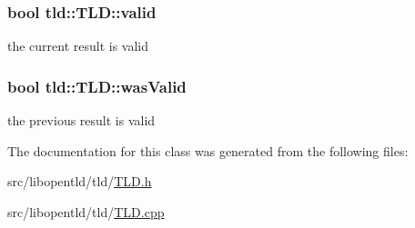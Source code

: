 \hypertarget{classtld_1_1TLD_a2a238338a62dac450b2759f99d5ae304}{
\subsubsection[{valid}]{\setlength{\rightskip}{0pt plus 5cm}bool tld\-::\-T\-L\-D\-::valid}}\label{classtld_1_1TLD_a2a238338a62dac450b2759f99d5ae304}


the current result is valid 

\hypertarget{classtld_1_1TLD_a26e0c624178eb37a57cd0146efa6d262}{
\subsubsection[{was\-Valid}]{\setlength{\rightskip}{0pt plus 5cm}bool tld\-::\-T\-L\-D\-::was\-Valid}}\label{classtld_1_1TLD_a26e0c624178eb37a57cd0146efa6d262}


the previous result is valid 



The documentation for this class was generated from the following files\-:\begin{DoxyCompactItemize}
\item 
src/libopentld/tld/\hyperlink{TLD_8h}{T\-L\-D.\-h}\item 
src/libopentld/tld/\hyperlink{TLD_8cpp}{T\-L\-D.\-cpp}\end{DoxyCompactItemize}
